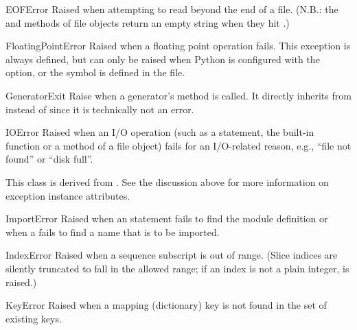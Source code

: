 \begin{excdesc}{EOFError}
  Raised when attempting to read beyond the end of a file.
  (N.B.: the  and  methods of file
  objects return an empty string when they hit \EOF.)
\end{excdesc}

\begin{excdesc}{FloatingPointError}
  Raised when a floating point operation fails.  This exception is
  always defined, but can only be raised when Python is configured
  with the  option, or the
   symbol is defined in the
   file.
\end{excdesc}

\begin{excdesc}{GeneratorExit}
  Raise when a generator's  method is called.
  It directly inherits from  instead of
   since it is technically not an error.
\end{excdesc}

\begin{excdesc}{IOError}
  Raised when an I/O operation (such as a  statement,
  the built-in  function or a method of a file
  object) fails for an I/O-related reason, e.g., ``file not found'' or
  ``disk full''.

  This class is derived from .  See the
  discussion above for more information on exception instance
  attributes.
\end{excdesc}

\begin{excdesc}{ImportError}
  Raised when an  statement fails to find the module
  definition or when a  fails to find a
  name that is to be imported.
\end{excdesc}

\begin{excdesc}{IndexError}
  Raised when a sequence subscript is out of range.  (Slice indices are
  silently truncated to fall in the allowed range; if an index is not a
  plain integer,  is raised.)
\end{excdesc}

\begin{excdesc}{KeyError}
  Raised when a mapping (dictionary) key is not found in the set of
  existing keys.
\end{excdesc}


